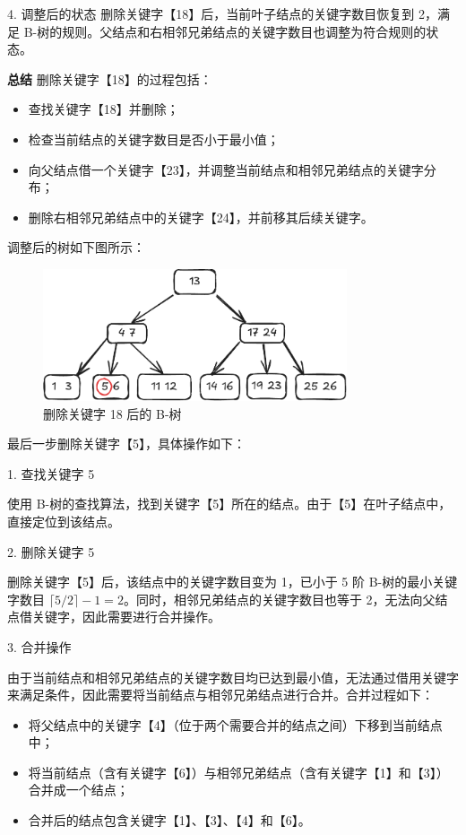 \documentclass[lang=cn,newtx,10pt,scheme=chinese]{../elegantbook}
\begin{document}
     4. 调整后的状态  
        删除关键字【18】后，当前叶子结点的关键字数目恢复到 2，满足 B-树的规则。父结点和右相邻兄弟结点的关键字数目也调整为符合规则的状态。
     
     
     \textbf{总结}  
     删除关键字【18】的过程包括：
     \begin{itemize}
       \item 查找关键字【18】并删除；
       \item 检查当前结点的关键字数目是否小于最小值；
       \item 向父结点借一个关键字【23】，并调整当前结点和相邻兄弟结点的关键字分布；
       \item 删除右相邻兄弟结点中的关键字【24】，并前移其后续关键字。
     \end{itemize}

     调整后的树如下图所示：
      \begin{figure}[h!]
          
            \centering
            \includegraphics[width=0.8\textwidth]{./figure/pdf/cropped/Btree_del4.pdf}
            \caption{删除关键字 18 后的 B-树}
            \label{fig:Btree_delete_18}

      \end{figure}

      最后一步删除关键字【5】，具体操作如下：

      1. 查找关键字 5  

         使用 B-树的查找算法，找到关键字【5】所在的结点。由于【5】在叶子结点中，直接定位到该结点。
      
      2. 删除关键字 5  

         删除关键字【5】后，该结点中的关键字数目变为 1，已小于 5 阶 B-树的最小关键字数目 $\lceil 5/2 \rceil - 1 = 2$。同时，相邻兄弟结点的关键字数目也等于 2，无法向父结点借关键字，因此需要进行合并操作。
      
      3. 合并操作  

         由于当前结点和相邻兄弟结点的关键字数目均已达到最小值，无法通过借用关键字来满足条件，因此需要将当前结点与相邻兄弟结点进行合并。合并过程如下：
         \begin{itemize}
           \item 将父结点中的关键字【4】（位于两个需要合并的结点之间）下移到当前结点中；
           \item 将当前结点（含有关键字【6】）与相邻兄弟结点（含有关键字【1】和【3】）合并成一个结点；
           \item 合并后的结点包含关键字【1】、【3】、【4】和【6】。
         \end{itemize}
      
\end{document}
